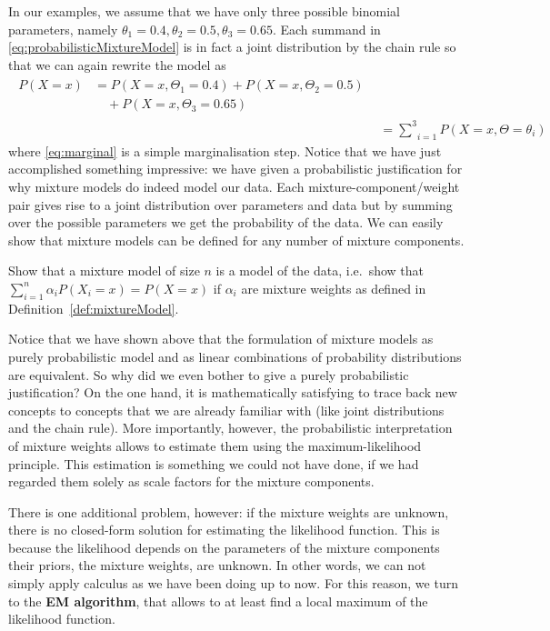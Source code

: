 In our examples, we assume that we have only three possible binomial parameters, namely $ \theta_{1} = 0.4, \theta_{2} = 0.5, \theta_{3} = 0.65 $. 
Each summand
in \eqref{eq:probabilisticMixtureModel} is in fact a joint distribution by the chain rule so that we can again rewrite the model as
\begin{align}
\begin{split}\label{eq:marginal}
P(X=x) &= P(X=x,\Theta_{1}=0.4) + P(X=x,\Theta_{2}=0.5)  \\
&\quad + P(X=x,\Theta_{3}=0.65)
\end{split} \\
&= \underset{i=1}{\overset{3}{{\sum}}} P(X=x,\Theta=\theta_{i}) \nonumber
\end{align}
where \eqref{eq:marginal} is a simple marginalisation step. Notice that we have just accomplished something impressive: we have given a probabilistic justification
for why mixture models do indeed model our data. Each mixture-component/weight pair gives rise to a joint distribution over parameters and data but by summing over the 
possible parameters we get the probability of the data. We can easily show that mixture models can be defined for any number of mixture components.

\begin{Exercise}
Show that a mixture model of size $ n $ is a model of the data, i.e.\ show that $  \sum_{i=1}^n \alpha_{i}P(X_i=x) = P(X=x) $ if $ \alpha_{i} $ are mixture weights as 
defined in Definition~\ref{def:mixtureModel}.
\end{Exercise}

Notice that we have shown above that the formulation of mixture models as purely probabilistic model and as linear combinations of probability distributions are
equivalent. So why did we even bother to give a purely probabilistic justification? On the one hand, it is mathematically satisfying to trace back new concepts
to concepts that we are already familiar with (like joint distributions and the chain rule). More importantly, however, the probabilistic interpretation of mixture
weights allows to estimate them using the maximum-likelihood principle. This estimation is something we could not have done, if we had regarded them solely as scale factors
for the mixture components. 

There is one additional problem, however: if the mixture weights are unknown, there is no closed-form solution for estimating the likelihood function. This is because
the likelihood depends on the parameters of the mixture components their priors, the mixture weights, are unknown. In other words, we can not simply apply calculus as we have been doing up to now. For this reason, we turn to the \textbf{EM algorithm}, that allows
to at least find a local maximum of the likelihood function.


